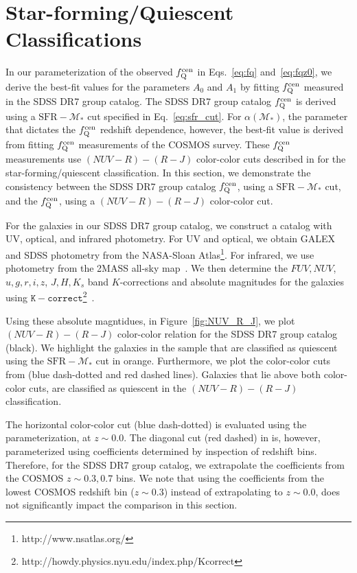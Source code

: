 \chapter*{Star-forming/Quiescent Classifications \label{chap:append3}}

In our parameterization of the observed $f_\mathrm{Q}^\mathrm{cen}$ in Eqs.~\ref{eq:fq} and~\ref{eq:fqz0}, 
we derive the best-fit values for the parameters $A_0$ and $A_1$ by fitting 
$f_\mathrm{Q}^\mathrm{cen}$ measured in the SDSS DR7 group catalog. The SDSS DR7 group catalog 
$f_\mathrm{Q}^\mathrm{cen}$ is derived using a $\mathrm{SFR} - \mathcal{M}_*$ cut 
specified in Eq.~\ref{eq:sfr_cut}. For $\alpha(\mathcal{M}_*)$, the 
parameter that dictates the $f_\mathrm{Q}^\mathrm{cen}$ redshift dependence, however, 
the best-fit value is derived from fitting \cite{Tinker:2013aa} 
$f_\mathrm{Q}^\mathrm{cen}$ measurements of the COSMOS survey. These $f_\mathrm{Q}^\mathrm{cen}$ measurements 
use $(NUV - R) - (R - J)$ color-color cuts described in 
\cite{Bundy:2010aa} for the star-forming/quiescent classification. 
In this section, we demonstrate the consistency between the SDSS 
DR7 group catalog $f_\mathrm{Q}^\mathrm{cen}$, using a $\mathrm{SFR} - \mathcal{M}_*$ 
cut, and the \cite{Tinker:2013aa} $f_\mathrm{Q}^\mathrm{cen}$, using a $(NUV - R) - (R - J)$ 
color-color cut.

For the galaxies in our SDSS DR7 group catalog, we construct a catalog
with UV, optical, and infrared photometry. For UV and optical, 
we obtain GALEX and SDSS photometry from the NASA-Sloan Atlas\footnote{http://www.nsatlas.org/}.
For infrared, we use photometry from the 2MASS all-sky map~\citep{Cutri:2000aa}. 
We then determine the $FUV, NUV$, $u, g, r, i, z$, $J, H, K_s$ 
band $K$-corrections and absolute magnitudes for the galaxies 
using $\mathtt{K-correct}$\footnote{http://howdy.physics.nyu.edu/index.php/Kcorrect}~\citep[v4.2][]{Blanton:2007aa}. 

Using these absolute magntidues, in Figure~\ref{fig:NUV_R_J}, we 
plot $(NUV-R) - (R-J)$ color-color relation for the SDSS DR7 group 
catalog (black). We highlight the galaxies in the sample that are 
classified as quiescent using the $\mathrm{SFR} - \mathcal{M}_*$
cut in orange. Furthermore, we plot the color-color cuts from 
\cite{Bundy:2010aa} (blue dash-dotted and red dashed lines). 
Galaxies that lie above both color-color cuts, are classified as 
quiescent in the $(NUV-R) - (R-J)$ classification. 

The horizontal color-color cut (blue dash-dotted) is evaluated
using the \cite{Bundy:2010aa} parameterization, at $z \sim 0.0$. The 
diagonal cut (red dashed) in \cite{Bundy:2010aa} is, however, 
parameterized using coefficients determined by inspection of 
redshift bins. Therefore, for the SDSS DR7 group catalog, we 
extrapolate the coefficients from the COSMOS $z \sim 0.3, 0.7$ 
bins. We note that using the coefficients from the lowest COSMOS 
redshift bin ($z \sim 0.3$) instead of extrapolating to $z \sim 0.0$,
does not significantly impact the comparison in this section. 

